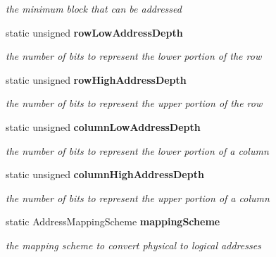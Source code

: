 \begin{DoxyCompactItemize}
\begin{DoxyCompactList}\small\item\em the minimum block that can be addressed \item\end{DoxyCompactList}\item 
static unsigned {\bf rowLowAddressDepth}\label{class_d_r_a_msim_i_i_1_1_address_a3034d24b617b7fc397e55b95667e6d0d}

\begin{DoxyCompactList}\small\item\em the number of bits to represent the lower portion of the row \item\end{DoxyCompactList}\item 
static unsigned {\bf rowHighAddressDepth}\label{class_d_r_a_msim_i_i_1_1_address_a3067a64b5977d9b1f375a6eda50c53e6}

\begin{DoxyCompactList}\small\item\em the number of bits to represent the upper portion of the row \item\end{DoxyCompactList}\item 
static unsigned {\bf columnLowAddressDepth}\label{class_d_r_a_msim_i_i_1_1_address_ae80941c385a9b89fcd082bacb916b5a5}

\begin{DoxyCompactList}\small\item\em the number of bits to represent the lower portion of a column \item\end{DoxyCompactList}\item 
static unsigned {\bf columnHighAddressDepth}\label{class_d_r_a_msim_i_i_1_1_address_a98ef042c63b6d22f81bc33823035cd94}

\begin{DoxyCompactList}\small\item\em the number of bits to represent the upper portion of a column \item\end{DoxyCompactList}\item 
static AddressMappingScheme {\bf mappingScheme}\label{class_d_r_a_msim_i_i_1_1_address_ac996a58ebfce70dd74f48e52fc7ff386}

\begin{DoxyCompactList}\small\item\em the mapping scheme to convert physical to logical addresses \item\end{DoxyCompactList}\end{DoxyCompactItemize}


